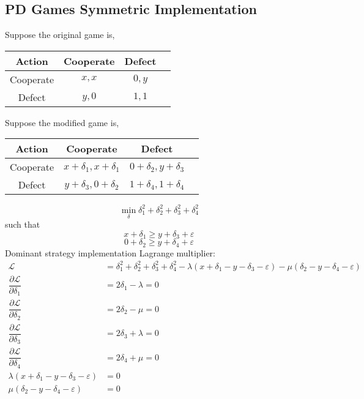 \documentclass{article}
\begin{document}
\subsection{PD Games Symmetric Implementation}
Suppose the original game is,
\begin{center} \begin{tabular}{|c|c|c|c|}
\hline
 Action &Cooperate &Defect\\ \hline
Cooperate &$x , x $ &$0, y $\\ \hline
Defect &$y , 0$ &$1, 1$\\ \hline
\end{tabular} \end{center}
Suppose the modified game is,
\begin{center} \begin{tabular}{|c|c|c|c|}
\hline
 Action &Cooperate &Defect\\ \hline
Cooperate &$x  + \delta_{1}, x  + \delta_{1}$ &$0 + \delta_{2}, y + \delta_{3}$\\ \hline
Defect &$y  + \delta_{3}, 0 + \delta_{2}$ &$1 + \delta_{4}, 1 + \delta_{4}$\\ \hline
\end{tabular} \end{center}
\begin{equation} 
\displaystyle\min_{\delta} \delta_{1}^{2} + \delta_{2}^{2} + \delta_{3}^{2} + \delta_{4}^{2}
\end{equation}
such that
\begin{equation} 
x  + \delta_{1} \geq  y  + \delta_{3} + \varepsilon
\end{equation}
\begin{equation} 
0 + \delta_{2} \geq  y  + \delta_{4} + \varepsilon
\end{equation}
Dominant strategy implementation Lagrange multiplier:
\begin{align*}
\mathcal{L} &= \delta_{1}^{2} + \delta_{2}^{2} + \delta_{3}^{2} + \delta_{4}^{2} - \lambda\left(x + \delta_{1} - y - \delta_{3} - \varepsilon\right) - \mu\left(\delta_{2} - y - \delta_{4} - \varepsilon\right)
\\ \dfrac{\partial \mathcal{L}}{\partial \delta_{1}} &= 2 \delta_{1} - \lambda = 0
\\ \dfrac{\partial \mathcal{L}}{\partial \delta_{2}} &= 2 \delta_{2} - \mu = 0
\\ \dfrac{\partial \mathcal{L}}{\partial \delta_{3}} &= 2 \delta_{3} + \lambda = 0
\\ \dfrac{\partial \mathcal{L}}{\partial \delta_{4}} &= 2 \delta_{4} + \mu = 0
\\ \lambda\left(x + \delta_{1} - y - \delta_{3} - \varepsilon\right) &= 0
\\ \mu\left(\delta_{2} - y - \delta_{4} - \varepsilon\right) &= 0
\end{align*}
\end{document}
